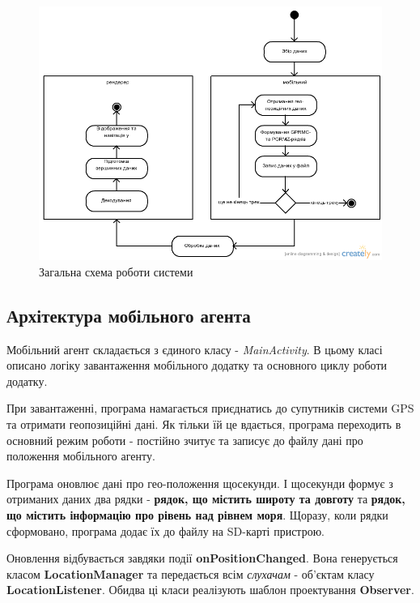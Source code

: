 \documentclass[simple,a4paper,14pt,ukrainian,utf8]{eskdtext}
\begin{document}
	\vspace{3em}
	\begin{figure}	
		\centering \includegraphics[scale=0.5]{images/general_workflow.png}
		\caption{Загальна схема роботи системи}
	\end{figure}

	\subsection{Архітектура мобільного агента}
	
	Мобільний агент складається з єдиного класу - \textit{MainActivity}. В цьому класі описано логіку завантаження мобільного додатку та основного циклу роботи додатку.
	
	При завантаженні, програма намагається приєднатись до супутників системи GPS та отримати геопозиційні дані. Як тільки їй це вдається, програма переходить в основний режим роботи - постійно зчитує та записує до файлу дані про положення мобільного агенту.
	
	Програма оновлює дані про гео-положення щосекунди. І щосекунди формує з отриманих даних два рядки - \textbf{рядок, що містить широту та довготу} та \textbf{рядок, що містить інформацію про рівень над рівнем моря}. Щоразу, коли рядки сформовано, програма додає їх до файлу на SD-карті пристрою.
	
	Оновлення відбувається завдяки події \textbf{onPositionChanged}. Вона генерується класом \textbf{LocationManager} та передається всім \textit{слухачам} - об’єктам класу \textbf{LocationListener}. Обидва ці класи реалізують шаблон проектування \textbf{Observer}.
	
\end{document}
